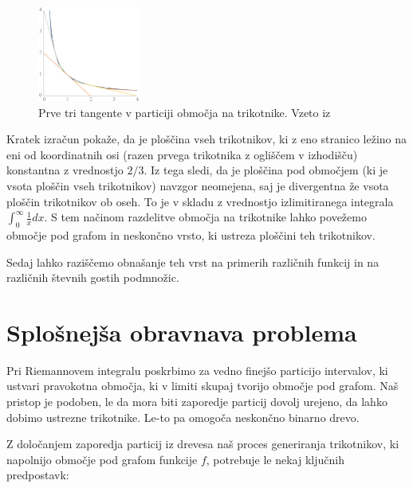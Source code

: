 \documentclass[a4paper, 12pt, titlepage]{article}
\begin{document}
\begin{figure}[h]
    \centering
    \includegraphics[width=0.3\textwidth]{slike/uvodni_primer_prvi_trikotniki.png}
    \caption{Prve tri tangente v particiji območja na trikotnike. Vzeto iz~\cite{osnovni_clanek}}
    \label{uvodni_primer_prvi_trikotniki}
\end{figure}

Kratek izračun pokaže, da je ploščina vseh trikotnikov, ki z eno stranico ležino na eni od koordinatnih osi (razen prvega trikotnika z ogliščem v izhodišču) konstantna z vrednostjo $ 2/3 $. Iz tega sledi, da je ploščina pod območjem (ki je vsota ploščin vseh trikotnikov) navzgor neomejena, saj je divergentna že vsota ploščin trikotnikov ob oseh. To je v skladu z vrednostjo izlimitiranega integrala $ \int_{0}^{\infty}\frac{1}{x}dx $. S tem načinom razdelitve območja na trikotnike lahko povežemo območje pod grafom in neskončno vrsto, ki ustreza ploščini teh trikotnikov.

Sedaj lahko raziščemo obnašanje teh vrst na primerih različnih funkcij in na različnih števnih gostih podmnožic.




\section{Splošnejša obravnava problema}

Pri Riemannovem integralu poskrbimo za vedno finejšo particijo intervalov, ki ustvari pravokotna območja, ki v limiti skupaj tvorijo območje pod grafom. Naš pristop je podoben, le da mora biti zaporedje particij dovolj urejeno, da lahko dobimo ustrezne trikotnike. Le-to pa omogoča neskončno binarno drevo.

Z določanjem zaporedja particij iz drevesa naš proces generiranja trikotnikov, ki napolnijo območje pod grafom funkcije $ f $, potrebuje le nekaj ključnih predpostavk:
\end{document}
